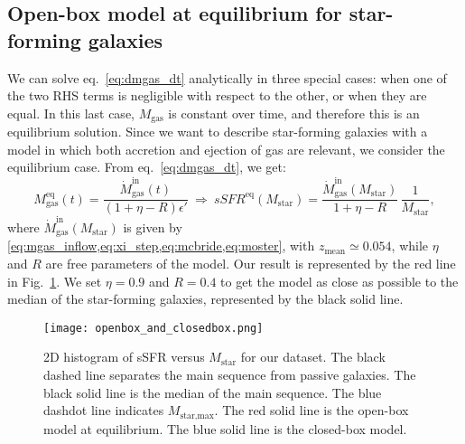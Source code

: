 \documentclass[fleqn,usenatbib]{mnras}
\begin{document}
\subsection{Open-box model at equilibrium for star-forming galaxies}\label{sec:open_box}
We can solve eq.~\ref{eq:dmgas_dt} analytically in three special cases: when one of the two RHS terms is negligible with respect to the other, or when they are equal. In this last case, $M_\text{gas}$ is constant over time, and therefore this is an equilibrium solution. Since we want to describe star-forming galaxies with a model in which both accretion and ejection of gas are relevant, we consider the equilibrium case. From eq.~\ref{eq:dmgas_dt}, we get:
{\fontsize{7.9pt}{7.9pt}\begin{equation}
    M^\text{eq}_\text{gas}(t) = \dfrac{\dot{M}_\text{gas}^\text{in}(t)}{(1+\eta-R)\epsilon'} \: \Rightarrow \: sSFR^\text{eq}\left(M_{\text{star}}\right) = \dfrac{\dot{M}_\text{gas}^\text{in}\left(M_{\text{star}}\right)}{1+\eta-R} \, \dfrac{1}{M_\text{star}},
	\label{eq:openbox_equilibrium}
\end{equation}}
where $\dot{M}_\text{gas}^\text{in}\left(M_{\text{star}}\right)$ is given by \cref{eq:mgas_inflow,eq:xi_step,eq:mcbride,eq:moster}, with $z_{\text{mean}} \simeq 0.054$, while $\eta$ and $R$ are free parameters of the model. Our result is represented by the red line in Fig.~\ref{fig:openbox_and_closedbox}. We set $\eta=0.9$ and $R=0.4$ to get the model as close as possible to the median of the star-forming galaxies, represented by the black solid line.

\begin{figure}\centering
	\texttt{[image: openbox\_and\_closedbox.png]}
    \caption{2D histogram of sSFR versus $M_{\text{star}}$ for our dataset. The black dashed line separates the main sequence from passive galaxies. The black solid line is the median of the main sequence. The blue dashdot line indicates $M_{\text{star,max}}$. The red solid line is the open-box model at equilibrium. The blue solid line is the closed-box model.}
    \label{fig:openbox_and_closedbox}
\end{figure}
\end{document}
